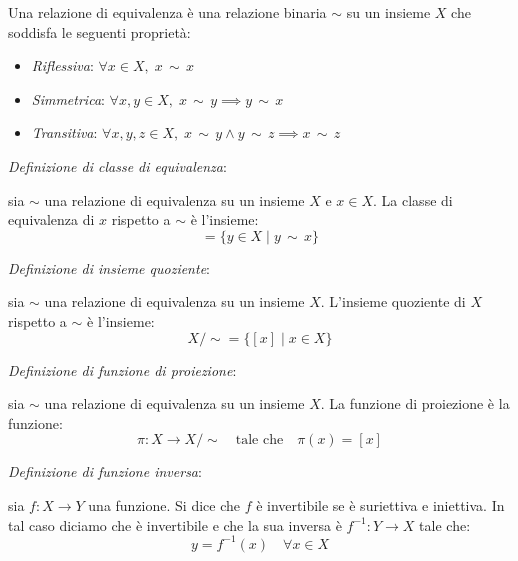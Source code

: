              Una relazione di equivalenza è una relazione binaria $\sim$ su un insieme $X$ che soddisfa le seguenti proprietà:
        \begin{definizione}
             \begin{itemize}
                  \item \emph{Riflessiva}: $\forall x \in X, \; x \, \sim \, x$
                   \item \emph{Simmetrica}: $\forall x, y \in X, \; x \, \sim \, y \implies y \, \sim \, x$
                  \item \emph{Transitiva}: $\forall x, y, z \in X, \; x \, \sim \, y \land y \, \sim \, z \implies x \, \sim \, z$
              \end{itemize}
        \end{definizione}
        \emph{Definizione di classe di equivalenza}:
    \begin{definizione} 
          sia $\sim$ una relazione di equivalenza su un insieme $X$ e $x \in X$. La classe di equivalenza di $x$ rispetto a $\sim$ è l'insieme:
            \begin{equation}
                 [x] = \{y \in X \; | \; y \, \sim \, x\}   
             \end{equation}
    \end{definizione}
        \emph{Definizione di insieme quoziente}:
    \begin{definizione}
                sia $\sim$ una relazione di equivalenza su un insieme $X$. L'insieme quoziente di $X$ rispetto a $\sim$ è l'insieme:
                \begin{equation}
                    X/\sim = \{[x] \; | \; x \in X\}
                \end{equation}
     \end{definizione} 
         \emph{Definizione di funzione di proiezione}:
    \begin{definizione} 
            sia $\sim$ una relazione di equivalenza su un insieme $X$. La funzione di proiezione è la funzione:
            \begin{equation}
                 \pi: X \to X/\sim \quad \text{tale che} \quad \pi(x) = [x]
          \end{equation}
    \end{definizione}
    \emph{Definizione di funzione inversa}:
    \begin{definizione} 
        sia $f: X \to Y$ una funzione. Si dice che $f$ è invertibile se è suriettiva e iniettiva. In tal caso diciamo che è invertibile e che la sua inversa è $f^{-1}: Y \to X$ tale che:
        \begin{equation}
            y=f^{-1}(x) \quad \forall x \in X
        \end{equation}
    \end{definizione}
